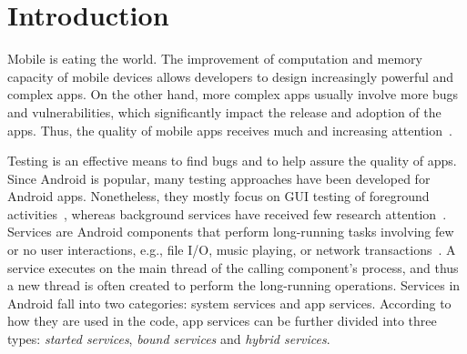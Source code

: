 \documentclass[sigconf,review, anonymous]{acmart}
\begin{document}
%
%
%
%


\maketitle

\section{Introduction}
Mobile is eating the world.
The improvement of computation and memory capacity of mobile devices allows
developers to design increasingly powerful and complex apps. On the other hand,
more complex apps usually involve more bugs and vulnerabilities, which
significantly impact the release and adoption of the apps.
Thus, the quality of mobile apps receives much and increasing
attention~\cite{ReavesBGABCDHKS16,AnandNHY12,MachiryTN13,ChoiNS13,LiuXC14,BanerjeeC0R14,LiuXCL14,HechtBRMD15,BehrouzSBM16,MirzaeiGBSM16,SuMCWYYPLS17,FanSCMLXPS18}.

Testing is an effective means to find bugs and to help assure the quality of
apps.
Since Android is popular, many testing approaches have
been developed for Android apps. Nonetheless, they mostly focus on GUI testing
of foreground activities~\cite{monkey,AnandNHY12,MachiryTN13,ChoiNS13,MirzaeiGBSM16,BaekB16,SuMCWYYPLS17,SongQH17},
whereas background services have received few research
attention~\cite{ZhangLLC17,ma2018}. Services are Android components that perform
long-running tasks involving few or no user interactions, e.g., file I/O, music
playing, or network transactions~\cite{Androidservice}. A service executes on
the main thread of the calling component's process, and thus a new thread is
often created to perform the long-running operations. Services in Android fall
into two categories: system services and app services.
According to how they are used in the code, app services can
be further divided into three types:
\textit{started services}, \textit{bound services} and \textit{hybrid services}.
\end{document}
